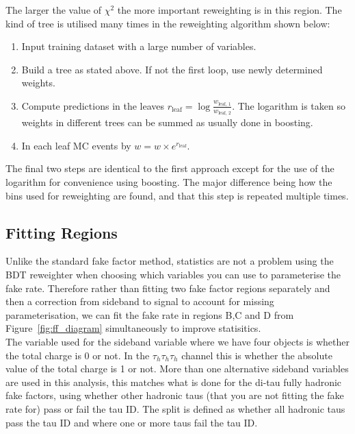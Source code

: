 The larger the value of $\chi^2$ the more important reweighting is in this region. The kind of tree is utilised many times in the reweighting algorithm shown below:

\begin{enumerate}
\item Input training dataset with a large number of variables.
\item Build a tree as stated above. If not the first loop, use newly determined weights.
\item Compute predictions in the leaves $r_{\text{leaf}} = \log\frac{w_{\text{leaf, 1}}}{w_{\text{leaf, 2}}}$. The logarithm is taken so weights in different trees can be summed as usually done in boosting.
\item In each leaf MC events by $w = w \times e^{r_{\text{leaf}}}$.
\end{enumerate}

The final two steps are identical to the first approach except for the use of the logarithm for convenience using boosting. The major difference being how the bins used for reweighting are found, and that this step is repeated multiple times.

\subsection{Fitting Regions}

Unlike the standard fake factor method, statistics are not a problem using the BDT reweighter when choosing which variables you can use to parameterise the fake rate. Therefore rather than fitting two fake factor regions separately and then a correction from sideband to signal to account for missing parameterisation, we can fit the fake rate in regions B,C and D from Figure~\ref{fig:ff_diagram} simultaneously to improve statisitics. \\

The variable used for the sideband variable where we have four objects is whether the total charge is 0 or not. In the $\tau_h \tau_h \tau_h$ channel this is whether the absolute value of the total charge is 1 or not. More than one alternative sideband variables are used in this analysis, this matches what is done for the di-tau fully hadronic fake factors, using whether other hadronic taus (that you are not fitting the fake rate for) pass or fail the tau ID. The split is defined as whether all hadronic taus pass the tau ID and where one or more taus fail the tau ID. \\

